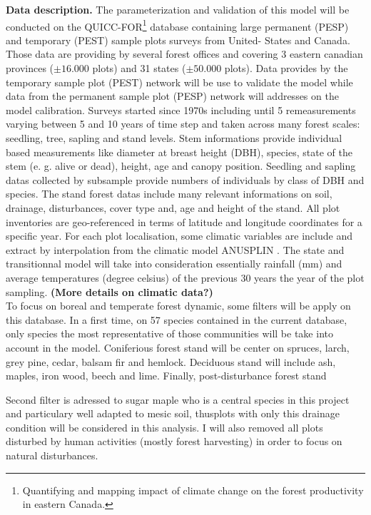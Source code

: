 \textbf{Data description.}  The parameterization and validation of this model
will be conducted on the QUICC-FOR\footnote{Quantifying and mapping impact of
climate change on the forest productivity in eastern Canada.} database
containing large permanent (PESP) and temporary (PEST) sample plots surveys
from United- States and Canada. Those data are providing by several forest
offices and covering 3 eastern canadian provinces ($\pm16.000$ plots) and 31
states ($\pm50.000$ plots). Data provides by the temporary sample plot (PEST)
network will be use to validate the model while data from the permanent sample
plot (PESP) network will addresses on the model calibration. Surveys started
since 1970s including until 5 remeasurements varying between 5 and 10 years of
time step and taken across many forest scales: seedling, tree, sapling and
stand levels. Stem informations provide individual based measurements like
diameter at breast height (DBH), species, state of the stem (e. g. alive or
dead), height, age and canopy position. Seedling and sapling datas collected
by subsample provide numbers of individuals  by class of DBH and species. The
stand forest datas include many relevant informations on soil, drainage,
disturbances, cover type and, age and height of the stand. All plot
inventories are geo-referenced in terms of latitude and longitude coordinates
for a specific year. For each plot localisation, some climatic variables are
include and extract by interpolation from the climatic model ANUSPLIN
\cite{McKenney2011}. The state and transitionnal model will take into
consideration essentially rainfall (mm) and average temperatures (degree
celsius) of the previous 30 years the year of the plot sampling. \textbf{(More
details on climatic data?)}\\

To focus on boreal and temperate forest dynamic, some filters will be apply on
this database.  In a first time, on 57 species contained in the current
database, only species the most representative of those communities will be
take into account in the model. Coniferious forest stand will be center on spruces,
larch, grey pine, cedar, balsam fir and hemlock. Deciduous stand will include
ash, maples, iron wood, beech and lime. Finally, post-disturbance forest stand 

Second filter is adressed to sugar maple who is a central species in this
project and particulary well adapted to mesic soil, thusplots with  only this
drainage condition will be considered in this analysis. I will also removed 
all plots disturbed by human activities (mostly forest harvesting) in order to
focus on natural disturbances.\\



